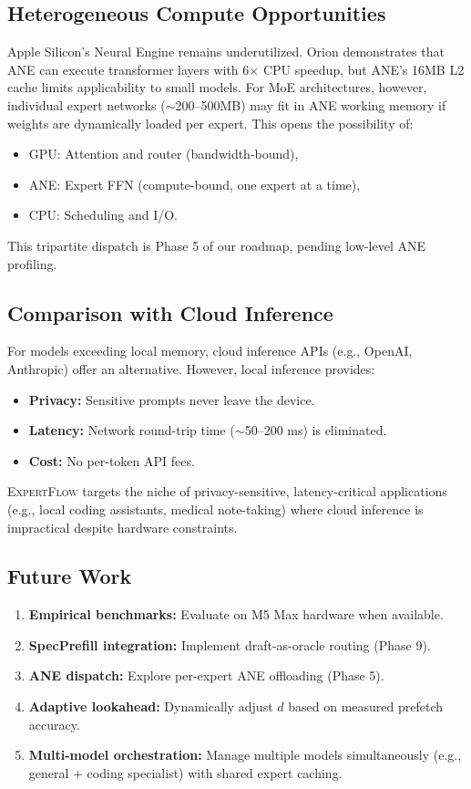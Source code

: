 \documentclass[11pt]{article}
\begin{document}
\subsection{Heterogeneous Compute Opportunities}

Apple Silicon's Neural Engine remains underutilized. Orion \cite{orion2025} demonstrates that ANE can execute transformer layers with 6$\times$ CPU speedup, but ANE's 16MB L2 cache limits applicability to small models. For MoE architectures, however, individual expert networks ($\sim$200--500MB) may fit in ANE working memory if weights are dynamically loaded per expert. This opens the possibility of:
\begin{itemize}
    \item GPU: Attention and router (bandwidth-bound),
    \item ANE: Expert FFN (compute-bound, one expert at a time),
    \item CPU: Scheduling and I/O.
\end{itemize}

This tripartite dispatch is Phase 5 of our roadmap, pending low-level ANE profiling.

\subsection{Comparison with Cloud Inference}

For models exceeding local memory, cloud inference APIs (e.g., OpenAI, Anthropic) offer an alternative. However, local inference provides:
\begin{itemize}
    \item \textbf{Privacy:} Sensitive prompts never leave the device.
    \item \textbf{Latency:} Network round-trip time ($\sim$50--200 ms) is eliminated.
    \item \textbf{Cost:} No per-token API fees.
\end{itemize}

\textsc{ExpertFlow} targets the niche of privacy-sensitive, latency-critical applications (e.g., local coding assistants, medical note-taking) where cloud inference is impractical despite hardware constraints.

\subsection{Future Work}

\begin{enumerate}
    \item \textbf{Empirical benchmarks:} Evaluate on M5 Max hardware when available.
    \item \textbf{SpecPrefill integration:} Implement draft-as-oracle routing (Phase 9).
    \item \textbf{ANE dispatch:} Explore per-expert ANE offloading (Phase 5).
    \item \textbf{Adaptive lookahead:} Dynamically adjust $d$ based on measured prefetch accuracy.
    \item \textbf{Multi-model orchestration:} Manage multiple models simultaneously (e.g., general + coding specialist) with shared expert caching.
\end{enumerate}
\end{document}
